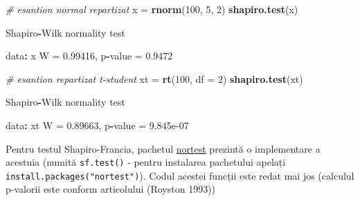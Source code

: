 \documentclass[]{article}
\newenvironment{Shaded}{\begin{snugshade}}{\end{snugshade}}
\newcommand{\KeywordTok}[1]{\textcolor[rgb]{0.13,0.29,0.53}{\textbf{#1}}}
\newcommand{\DataTypeTok}[1]{\textcolor[rgb]{0.13,0.29,0.53}{#1}}
\newcommand{\DecValTok}[1]{\textcolor[rgb]{0.00,0.00,0.81}{#1}}
\newcommand{\FloatTok}[1]{\textcolor[rgb]{0.00,0.00,0.81}{#1}}
\newcommand{\StringTok}[1]{\textcolor[rgb]{0.31,0.60,0.02}{#1}}
\newcommand{\CommentTok}[1]{\textcolor[rgb]{0.56,0.35,0.01}{\textit{#1}}}
\newcommand{\OperatorTok}[1]{\textcolor[rgb]{0.81,0.36,0.00}{\textbf{#1}}}
\newcommand{\NormalTok}[1]{#1}
\begin{document}
\begin{Shaded}
\begin{Highlighting}[]
\CommentTok{# esantion normal repartizat }
\NormalTok{x =}\StringTok{ }\KeywordTok{rnorm}\NormalTok{(}\DecValTok{100}\NormalTok{, }\DecValTok{5}\NormalTok{, }\DecValTok{2}\NormalTok{)}
\KeywordTok{shapiro.test}\NormalTok{(x)}

\NormalTok{    Shapiro}\OperatorTok{-}\NormalTok{Wilk normality test}

\NormalTok{data}\OperatorTok{:}\StringTok{  }\NormalTok{x}
\NormalTok{W =}\StringTok{ }\FloatTok{0.99416}\NormalTok{, p}\OperatorTok{-}\NormalTok{value =}\StringTok{ }\FloatTok{0.9472}

\CommentTok{# esantion repartizat t-student}
\NormalTok{xt =}\StringTok{ }\KeywordTok{rt}\NormalTok{(}\DecValTok{100}\NormalTok{, }\DataTypeTok{df =} \DecValTok{2}\NormalTok{)}
\KeywordTok{shapiro.test}\NormalTok{(xt)}

\NormalTok{    Shapiro}\OperatorTok{-}\NormalTok{Wilk normality test}

\NormalTok{data}\OperatorTok{:}\StringTok{  }\NormalTok{xt}
\NormalTok{W =}\StringTok{ }\FloatTok{0.89663}\NormalTok{, p}\OperatorTok{-}\NormalTok{value =}\StringTok{ }\FloatTok{9.845e-07}
\end{Highlighting}
\end{Shaded}

Pentru testul Shapiro-Francia, pachetul
\href{https://cran.r-project.org/web/packages/nortest/}{nortest}
prezintă o implementare a acestuia (numită \texttt{sf.test()} - pentru
instalarea pachetului apelați \texttt{install.packages("nortest")}).
Codul acestei funcții este redat mai jos (calculul p-valorii este
conform articolului (Royston 1993))
\end{document}
